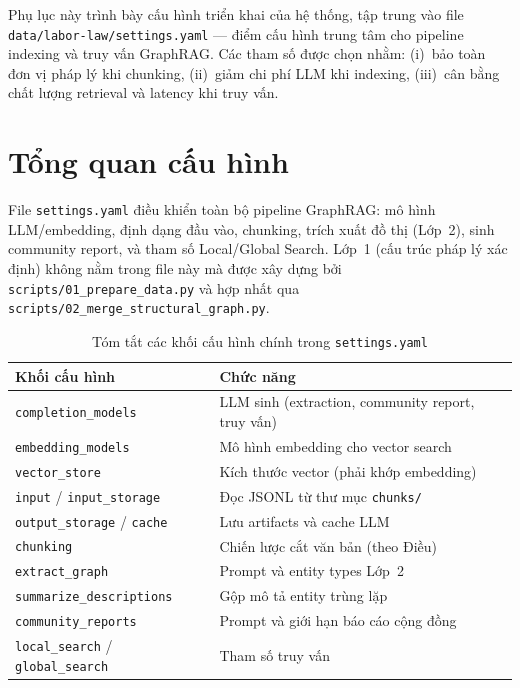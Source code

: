 \documentclass[../DoAn.tex]{subfiles}
\begin{document}
Phụ lục này trình bày cấu hình triển khai của hệ thống, tập trung vào file \texttt{data/labor-law/settings.yaml} --- điểm cấu hình trung tâm cho pipeline indexing và truy vấn GraphRAG. Các tham số được chọn nhằm: (i)~bảo toàn đơn vị pháp lý khi chunking, (ii)~giảm chi phí LLM khi indexing, (iii)~cân bằng chất lượng retrieval và latency khi truy vấn.

\section{Tổng quan cấu hình}
\label{appendix:a-overview}

File \texttt{settings.yaml} điều khiển toàn bộ pipeline GraphRAG: mô hình LLM/embedding, định dạng đầu vào, chunking, trích xuất đồ thị (Lớp~2), sinh community report, và tham số Local/Global Search. Lớp~1 (cấu trúc pháp lý xác định) không nằm trong file này mà được xây dựng bởi \texttt{scripts/01\_prepare\_data.py} và hợp nhất qua \texttt{scripts/02\_merge\_structural\_graph.py}.

\begin{table}[htbp]
\centering
\caption{Tóm tắt các khối cấu hình chính trong \texttt{settings.yaml}}
\label{table:settings-overview}
\small
\begin{tabular}{|l|p{9cm}|}
\hline
\textbf{Khối cấu hình} & \textbf{Chức năng} \\
\hline
\texttt{completion\_models} & LLM sinh (extraction, community report, truy vấn) \\
\texttt{embedding\_models} & Mô hình embedding cho vector search \\
\texttt{vector\_store} & Kích thước vector (phải khớp embedding) \\
\texttt{input} / \texttt{input\_storage} & Đọc JSONL từ thư mục \texttt{chunks/} \\
\texttt{output\_storage} / \texttt{cache} & Lưu artifacts và cache LLM \\
\texttt{chunking} & Chiến lược cắt văn bản (theo Điều) \\
\texttt{extract\_graph} & Prompt và entity types Lớp~2 \\
\texttt{summarize\_descriptions} & Gộp mô tả entity trùng lặp \\
\texttt{community\_reports} & Prompt và giới hạn báo cáo cộng đồng \\
\texttt{local\_search} / \texttt{global\_search} & Tham số truy vấn \\
\hline
\end{tabular}
\end{table}
\end{document}
